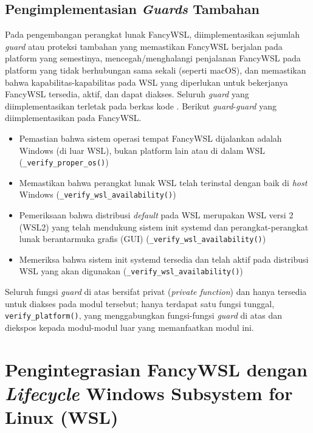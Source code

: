 \subsection{Pengimplementasian \textit{Guards} Tambahan}

Pada pengembangan perangkat lunak FancyWSL, diimplementasikan sejumlah \textit{guard} atau proteksi tambahan yang memastikan FancyWSL berjalan pada platform yang semestinya, mencegah/menghalangi penjalanan FancyWSL pada platform yang tidak berhubungan sama sekali (seperti macOS), dan memastikan bahwa kapabilitas-kapabilitas pada WSL yang diperlukan untuk bekerjanya FancyWSL tersedia, aktif, dan dapat diakses. Seluruh \textit{guard} yang diimplementasikan terletak pada berkas kode . Berikut \textit{guard}-\textit{guard} yang diimplementasikan pada FancyWSL.

\begin{itemize}
    \item Pemastian bahwa sistem operasi tempat FancyWSL dijalankan adalah Windows (di luar WSL), bukan platform lain atau di dalam WSL (\verb|_verify_proper_os()|)
    
    \item Memastikan bahwa perangkat lunak WSL telah terinstal dengan baik di \textit{host} Windows (\verb|_verify_wsl_availability()|)
    
    \item Pemeriksaan bahwa distribusi \textit{default} pada WSL merupakan WSL versi 2 (WSL2) yang telah mendukung sistem init systemd dan perangkat-perangkat lunak berantarmuka grafis (GUI) (\verb|_verify_wsl_availability()|)
    
    \item Memeriksa bahwa sistem init systemd tersedia dan telah aktif pada distribusi WSL yang akan digunakan (\verb|_verify_wsl_availability()|)
\end{itemize}

Seluruh fungsi \textit{guard} di atas bersifat privat (\textit{private function}) dan hanya tersedia untuk diakses pada modul tersebut; hanya terdapat satu fungsi tunggal, \verb|verify_platform()|, yang menggabungkan fungsi-fungsi \textit{guard} di atas dan diekspos kepada modul-modul luar yang memanfaatkan modul ini.

\section{Pengintegrasian FancyWSL dengan \textit{Lifecycle} Windows Subsystem for Linux (WSL)}

